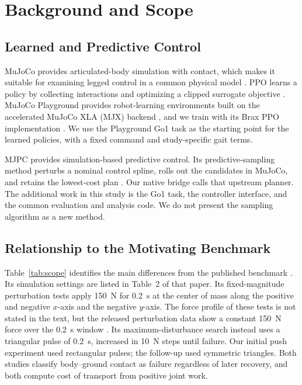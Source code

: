 \documentclass[conference]{IEEEtran}
\begin{document}
\section{Background and Scope}

\subsection{Learned and Predictive Control}

MuJoCo provides articulated-body simulation with contact, which makes it suitable for examining legged control in a common physical model \cite{todorov2012}. PPO learns a policy by collecting interactions and optimizing a clipped surrogate objective \cite{schulman2017}. MuJoCo Playground provides robot-learning environments built on the accelerated MuJoCo XLA (MJX) backend \cite{zakka2025}, and we train with its Brax PPO implementation \cite{freeman2021}. We use the Playground Go1 task as the starting point for the learned policies, with a fixed command and study-specific gait terms.

MJPC provides simulation-based predictive control. Its predictive-sampling method perturbs a nominal control spline, rolls out the candidates in MuJoCo, and retains the lowest-cost plan \cite{howell2022}. Our native bridge calls that upstream planner. The additional work in this study is the Go1 task, the controller interface, and the common evaluation and analysis code. We do not present the sampling algorithm as a new method.

\subsection{Relationship to the Motivating Benchmark}

Table~\ref{tab:scope} identifies the main differences from the published benchmark \cite{akki2025}. Its simulation settings are listed in Table~2 of that paper. Its fixed-magnitude perturbation tests apply 150~N for 0.2~s at the center of mass along the positive and negative $x$-axis and the negative $y$-axis. The force profile of these tests is not stated in the text, but the released perturbation data show a constant 150~N force over the 0.2~s window \cite{akkirepo}. Its maximum-disturbance search instead uses a triangular pulse of 0.2~s, increased in 10~N steps until failure. Our initial push experiment used rectangular pulses; the follow-up used symmetric triangles. Both studies classify body--ground contact as failure regardless of later recovery, and both compute cost of transport from positive joint work.
\end{document}
